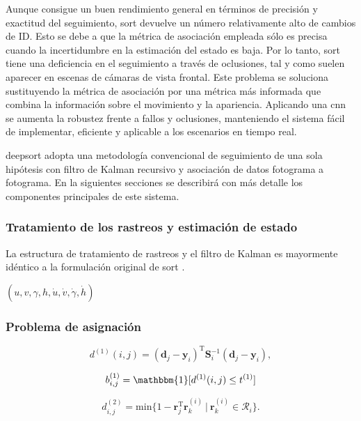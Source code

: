Aunque consigue un buen rendimiento general en términos de precisión y exactitud del seguimiento, \gls{sort} devuelve un número relativamente alto de cambios de ID. Esto se debe a que la métrica de asociación empleada sólo es precisa cuando la incertidumbre en la estimación del estado es baja. Por lo tanto, \gls{sort} tiene una deficiencia en el seguimiento a través de oclusiones, tal y como suelen aparecer en escenas de cámaras de vista frontal. Este problema se soluciona sustituyendo la métrica de asociación por una métrica más informada que combina la información sobre el movimiento y la apariencia. Aplicando una \gls{cnn} se aumenta la robustez frente a fallos y oclusiones, manteniendo el sistema fácil de implementar, eficiente y aplicable a los escenarios en tiempo real.

\gls{deepsort} adopta una metodología convencional de seguimiento de una sola hipótesis con filtro de Kalman recursivo y asociación de datos fotograma a fotograma. En la siguientes secciones se describirá con más detalle los componentes principales de este sistema.

\subsubsection*{Tratamiento de los rastreos y estimación de estado}
\label{subsubsec:track-handling-and-state-estimation}

La estructura de tratamiento de rastreos y el filtro de Kalman es mayormente idéntico a la formulación original de \gls{sort} \cite{Bewley_2016}.

$(u,v,\gamma,h,\dot{u},\dot{v},\dot{\gamma},\dot{h})$

\subsubsection*{Problema de asignación}
\label{subsubsec:assignment-problem}

\begin{equation}
\label{eq:equation1-deepsort}
d^{(1)} (i,j) = (\boldsymbol{d}_{j} - \boldsymbol{y}_{i})^{\text{T}} \boldsymbol{S}_{i}^{-1} (\boldsymbol{d}_{j} - \boldsymbol{y}_{i}),
\end{equation}

\begin{equation}
\label{eq:equation2-deepsort}
b_{i,j}^{(1)} = \mathbbm{1}[d^{(1)} (i,j) \leq t^{(1)}]
\end{equation}

\begin{equation}
\label{eq:equation3-deepsort}
d_{i,j}^{(2)} = \text{min} \{1 - \boldsymbol{r}_{j}^{\text{T}} \boldsymbol{r}_{k}^{(i)} \ | \ \boldsymbol{r}_{k}^{(i)} \in \mathcal{R}_i \}.
\end{equation}

